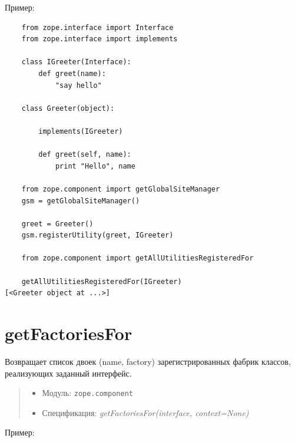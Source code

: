 \documentclass[a4paper,openany,twoside,draft]{book}
\providecommand*{\DUroletitlereference}[1]{\textsl{#1}}
\begin{document}
Пример:

\begin{verbatim}
    from zope.interface import Interface
    from zope.interface import implements

    class IGreeter(Interface):
        def greet(name):
            "say hello"

    class Greeter(object):

        implements(IGreeter)

        def greet(self, name):
            print "Hello", name

    from zope.component import getGlobalSiteManager
    gsm = getGlobalSiteManager()

    greet = Greeter()
    gsm.registerUtility(greet, IGreeter)

    from zope.component import getAllUtilitiesRegisteredFor

    getAllUtilitiesRegisteredFor(IGreeter)
[<Greeter object at ...>]
\end{verbatim}


\section*{getFactoriesFor%
  \label{getfactoriesfor}%
}

Возвращает список двоек (name, factory) зарегистрированных фабрик классов, реализующих заданный интерфейс.

\begin{quote}

\begin{itemize}

\item Модуль: \texttt{zope.component}

\item Спецификация: \DUroletitlereference{getFactoriesFor(interface, context=None)}

\end{itemize}

\end{quote}

Пример:
\end{document}
